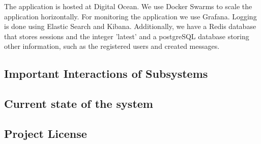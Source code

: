 



The application is hosted at Digital Ocean. We use Docker Swarms to scale the application horizontally. For 
monitoring the application we use Grafana. Logging is done using Elastic Search and Kibana. Additionally, we have a Redis database 
that stores sessions and the integer 'latest' and a postgreSQL database storing other information, such as 
the registered users and created messages. 

\subsection{Important Interactions of Subsystems}

\subsection{Current state of the system}

\subsection{Project License}